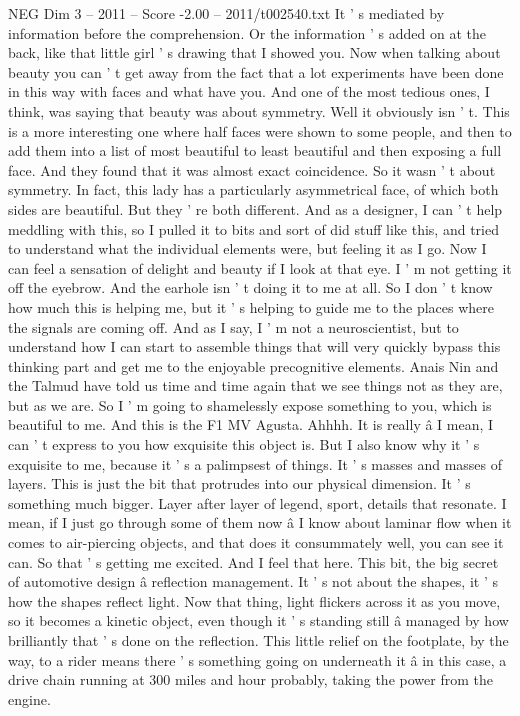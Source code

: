 \begin{textsample}{NEG Dim 3 – 2011 – Score -2.00 – 2011/t002540.txt}
It ' s mediated by information before the comprehension.
Or the information ' s added on at the back, like that little girl ' s drawing that I showed you.
Now when talking about beauty you can ' t get away from the fact that a lot experiments have been done in this way with faces and what have you.
And one of the most tedious ones, I think, was saying that beauty was about symmetry.
Well it obviously isn ' t.
This is a more interesting one where half faces were shown to some people, and then to add them into a list of most beautiful to least beautiful and then exposing a full face.
And they found that it was almost exact coincidence.
So it wasn ' t about symmetry.
In fact, this lady has a particularly asymmetrical face, of which both sides are beautiful.
But they ' re both different.
And as a designer, I can ' t help meddling with this, so I pulled it to bits and sort of did stuff like this, and tried to understand what the individual elements were, but feeling it as I go.
Now I can feel a sensation of delight and beauty if I look at that eye.
I ' m not getting it off the eyebrow.
And the earhole isn ' t doing it to me at all.
So I don ' t know how much this is helping me, but it ' s helping to guide me to the places where the signals are coming off.
And as I say, I ' m not a neuroscientist, but to understand how I can start to assemble things that will very quickly bypass this thinking part and get me to the enjoyable precognitive elements.
Anais Nin and the Talmud have told us time and time again that we see things not as they are, but as we are.
So I ' m going to shamelessly expose something to you, which is beautiful to me.
And this is the F1 MV Agusta.
Ahhhh.
It is really â I mean, I can ' t express to you how exquisite this object is.
But I also know why it ' s exquisite to me, because it ' s a palimpsest of things.
It ' s masses and masses of layers.
This is just the bit that protrudes into our physical dimension.
It ' s something much bigger.
Layer after layer of legend, sport, details that resonate.
I mean, if I just go through some of them now â I know about laminar flow when it comes to air-piercing objects, and that does it consummately well, you can see it can.
So that ' s getting me excited.
And I feel that here.
This bit, the big secret of automotive design â reflection management.
It ' s not about the shapes, it ' s how the shapes reflect light.
Now that thing, light flickers across it as you move, so it becomes a kinetic object, even though it ' s standing still â managed by how brilliantly that ' s done on the reflection.
This little relief on the footplate, by the way, to a rider means there ' s something going on underneath it â in this case, a drive chain running at 300 miles and hour probably, taking the power from the engine.

\end{textsample}
